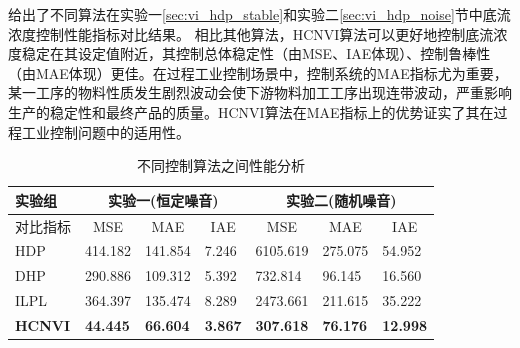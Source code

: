 给出了不同算法在实验一\ref{sec:vi_hdp_stable}和实验二\ref{sec:vi_hdp_noise}节中底流浓度控制性能指标对比结果。
相比其他算法，HCNVI算法可以更好地控制底流浓度稳定在其设定值附近，其控制总体稳定性（由MSE、IAE体现）、控制鲁棒性（由MAE体现）更佳。在过程工业控制场景中，控制系统的MAE指标尤为重要，某一工序的物料性质发生剧烈波动会使下游物料加工工序出现连带波动，严重影响生产的稳定性和最终产品的质量。HCNVI算法在MAE指标上的优势证实了其在过程工业控制问题中的适用性。


\begin{table}[htb]

\caption{不同控制算法之间性能分析}
\begin{tabular}{l|lll|lll}
\toprule
实验组 & \multicolumn{3}{c|}{实验一(恒定噪音)} & \multicolumn{3}{c}{实验二(随机噪音)} \\
\hline 对比指标 & \multicolumn{1}{c}{MSE\footnotemark[1]} &
\multicolumn{1}{c}{MAE\footnotemark[2]} &
\multicolumn{1}{c|}{IAE\footnotemark[3]} & \multicolumn{1}{c}{MSE} &
\multicolumn{1}{c}{MAE} & \multicolumn{1}{c}{IAE} \\ \hline
HDP & 414.182& 141.854 & 7.246 & 6105.619 & 275.075 & 54.952 \\
DHP & 290.886 & 109.312 & 5.392 & 732.814 & 96.145 & 16.560 \\
ILPL & 364.397 & 135.474 & 8.289 & 2473.661 &211.615 & 35.222 \\
\textbf{HCNVI} & \textbf{44.445} & \textbf{66.604} & \textbf{3.867} & \textbf{307.618} & \textbf{76.176} & \textbf{12.998} \\
\bottomrule
\end{tabular}%
\label{tab:MSE_cmp} \centering
\end{table}

  


